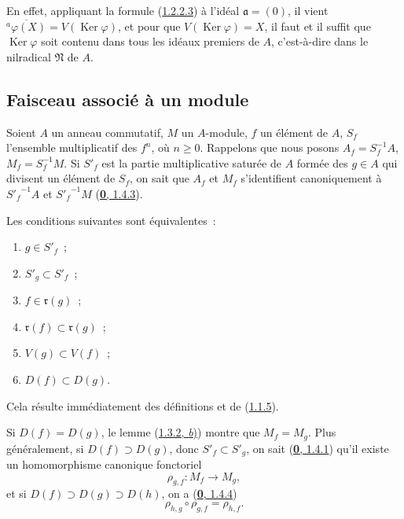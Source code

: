 En effet, appliquant la formule (\hyperref[I.1.2.2.3-fr]{1.2.2.3}) à l'idéal
$\mathfrak{a}=(0)$, il vient
$\overline{{}^a\varphi(X)}=V(\operatorname{Ker}\varphi)$, et pour que
$V(\operatorname{Ker}\varphi)=X$, il faut et il suffit que
$\operatorname{Ker}\varphi$ soit contenu dans tous les idéaux premiers de
$A$, c'est-à-dire dans le nilradical $\mathfrak{N}$ de $A$.

\subsection{Faisceau associé à un module}
\label{subsection:I.1.3-fr}
\label{I.1.3-fr}

\begin{env}[1.3.1]
\label{I.1.3.1-fr}
Soient $A$ un anneau commutatif, $M$ un $A$-module, $f$ un élément de $A$,
$S_f$ l'ensemble multiplicatif des $f^n$, où $n\geq0$. Rappelons que nous
posons $A_f=S_f^{-1}A$, $M_f=S_f^{-1}M$. Si $S'_f$ est la partie
multiplicative saturée de $A$ formée des $g\in A$ qui divisent un élément de
$S_f$, on sait que $A_f$ et $M_f$ s'identifient canoniquement à
${S'_f}^{-1}A$ et ${S'_f}^{-1}M$
(\hyperref[0.1.4.3-fr]{\textbf{0}, 1.4.3}).
\end{env}

\begin{lemma}[1.3.2]
\label{I.1.3.2-fr}
Les conditions suivantes sont équivalentes~:
\begin{enumerate}
  \item[\textit{a})] $g\in S'_f$~;
  \item[\textit{b})] $S'_g\subset S'_f$~;
  \item[\textit{c})] $f\in\mathfrak{r}(g)$~;
  \item[\textit{d})] $\mathfrak{r}(f)\subset\mathfrak{r}(g)$~;
  \item[\textit{e})] $V(g)\subset V(f)$~;
  \item[\textit{f})] $D(f)\subset D(g)$.
\end{enumerate}
\end{lemma}

Cela résulte immédiatement des définitions et de
(\hyperref[I.1.1.5-fr]{1.1.5}).

\begin{env}[1.3.3]
\label{I.1.3.3-fr}
Si $D(f)=D(g)$, le lemme (\hyperref[I.1.3.2-fr]{1.3.2, \textit{b})}) montre que
$M_f=M_g$. Plus généralement, si $D(f)\supset D(g)$, donc
$S'_f\subset S'_g$, on sait (\hyperref[0.1.4.1-fr]{\textbf{0}, 1.4.1}) qu'il existe un
homomorphisme canonique fonctoriel
\[
  \rho_{g,f}:M_f\longrightarrow M_g,
\]
et si $D(f)\supset D(g)\supset D(h)$, on a
(\hyperref[0.1.4.4-fr]{\textbf{0}, 1.4.4})
\begin{equation}
  \rho_{h,g}\circ\rho_{g,f}=\rho_{h,f}.
  \tag{1.3.3.1}\label{I.1.3.3.1-fr}
\end{equation}
\end{env}

